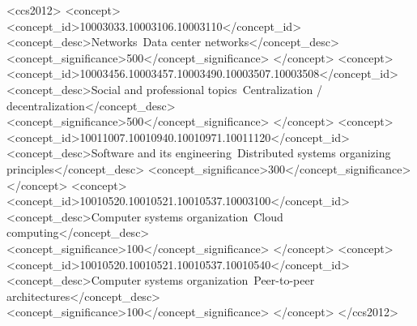 \documentclass[sigchi-a, authorversion]{acmart}
\begin{document}
%
%
\begin{CCSXML}
<ccs2012>
 <concept>
 <concept_id>10003033.10003106.10003110</concept_id>
 <concept_desc>Networks~Data center networks</concept_desc>
 <concept_significance>500</concept_significance>
 </concept>
 <concept>
 <concept_id>10003456.10003457.10003490.10003507.10003508</concept_id>
 <concept_desc>Social and professional topics~Centralization / decentralization</concept_desc>
 <concept_significance>500</concept_significance>
 </concept>
 <concept>
 <concept_id>10011007.10010940.10010971.10011120</concept_id>
 <concept_desc>Software and its engineering~Distributed systems organizing principles</concept_desc>
 <concept_significance>300</concept_significance>
 </concept>
 <concept>
 <concept_id>10010520.10010521.10010537.10003100</concept_id>
 <concept_desc>Computer systems organization~Cloud computing</concept_desc>
 <concept_significance>100</concept_significance>
 </concept>
 <concept>
 <concept_id>10010520.10010521.10010537.10010540</concept_id>
 <concept_desc>Computer systems organization~Peer-to-peer architectures</concept_desc>
 <concept_significance>100</concept_significance>
 </concept>
</ccs2012>
\end{CCSXML}



\begin{abstract} %
  UPDATED---\today. 
\end{abstract}
\end{document}
